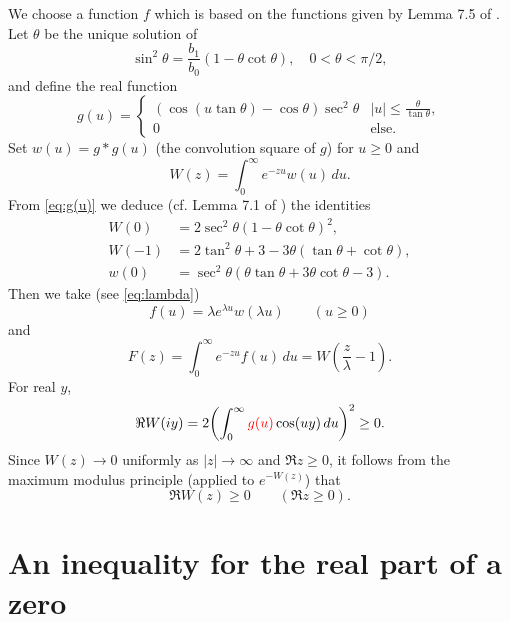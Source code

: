 \documentclass[10pt]{amsart}
\theoremstyle{remark}
\theoremstyle{plain}
\numberwithin{equation}{section}
\theoremstyle{definition}
\def\({\left(}
\def\){\right)}
\def\lam{\lambda}
\newcommand{\rev}[1]{{\color{red}#1}}
\begin{document}
We choose a function $f$ which is based on the functions
given by Lemma 7.5 of \cite{HB2}.  Let $\theta$ be the unique
solution of
\begin{equation}
\sin^2 \theta = \frac{b_1}{b_0} (1-\theta \cot\theta), \quad
0 < \theta < \pi/2,
\label{eq:theta}
\end{equation}
and define the real function
\begin{equation}
g(u) = \begin{cases} 
(\cos(u\tan\theta)-\cos\theta )\sec^2 \theta & |u| \le \frac{\theta}
{\tan\theta}, \\ 0 & \text{else.} \end{cases} \label{eq:g(u)}
\end{equation}
Set $w(u)=g*g(u)$ (the convolution square of $g$) for $u\ge 0$ and
$$
W(z)=\int_0^\infty e^{-zu} w(u)\, du.
$$
From \eqref{eq:g(u)} we deduce (cf. Lemma 7.1 of \cite{HB2}) the identities
\begin{equation}
\begin{split}
W(0) &= 2\sec^2 \theta (1-\theta\cot\theta)^2, \\
W(-1) &= 2\tan^2\theta+3-3\theta(\tan\theta+\cot\theta), \\
w(0) &= \sec^2\theta (\theta\tan\theta+3\theta\cot\theta-3).
\end{split}
\label{eq:Ww}
\end{equation}
Then we take (see \eqref{eq:lambda})
\begin{equation}
f(u) = \lam e^{\lam u} w(\lam u) \qquad (u\ge 0)
\label{eq:f}
\end{equation}
and
\begin{equation}
F(z) = \int_0^\infty e^{-zu} f(u)\, du = W\( \frac{z}{\lam} -1 \).
\label{eq:F}
\end{equation}
For real $y$,
$$
\Re W(iy) = 2 \biggl( \int_0^\infty \rev{g(u)} \cos(uy)\, du \biggr)^2 \ge 0.
$$
Since $W(z) \to 0$ uniformly as $|z|\to \infty$ and $\Re z \ge 0$,
it follows from the maximum modulus principle (applied to $e^{-W(z)}$) that
\begin{equation}
\Re W(z) \ge 0 \qquad (\Re z \ge 0).
\label{eq:Re W}
\end{equation}

%
%
\section{An inequality for the real part of a zero}
\label{sec:zero inequality}
%
%
%
\end{document}
